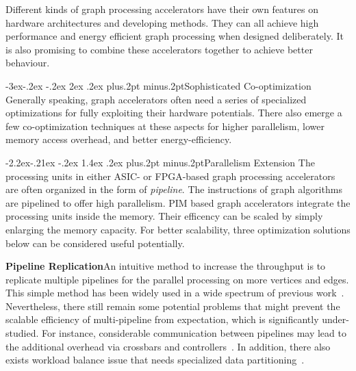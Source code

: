 \documentclass[twoside]{article}
\makeatletter
\def\subsection{\@startsection{subsection}{2}{\z@}%
 {-3ex\@plus -.2ex \@minus -.2ex}%
 {2ex \@plus.2ex}%
{\normalfont\normalsize\protect\baselineskip=12.5pt plus.2pt minus.2pt\bfseries}}
\def\subsubsection{\@startsection{subsubsection}{3}{\z@}%
 {-2.2ex\@plus -.21ex \@minus -.2ex}%
 {1.4ex \@plus.2ex}
{\normalfont\normalsize\protect\baselineskip=12pt plus.2pt minus.2pt\sl}}
\makeatother
\begin{document}
\begin{multicols}{2}
Different kinds of graph processing accelerators have their own features on hardware architectures and developing methods. They can all achieve high performance and energy efficient graph processing when designed deliberately. It is also promising to combine these accelerators together to achieve better behaviour. 

\subsection{Sophisticated Co-optimization}
Generally speaking, graph accelerators often need a series of specialized optimizations for fully exploiting their hardware potentials.
There also emerge a few co-optimization techniques at these aspects for higher parallelism, lower memory access overhead, and better energy-efficiency.

\subsubsection{Parallelism Extension}
The processing units in either ASIC- or FPGA-based graph processing accelerators are often organized in the form of {\em pipeline}. The instructions of graph algorithms are pipelined to offer high parallelism. PIM based graph accelerators integrate the processing units inside the memory. Their efficency can be scaled by simply enlarging the memory capacity. For better scalability, three optimization solutions below can be considered useful potentially.

{\bf Pipeline Replication}\quad An intuitive method to increase the throughput is to replicate multiple pipelines for the parallel processing on more vertices and edges. This simple method has been widely used in a wide spectrum of previous work~\cite{ham2016graphicionado,ozdal2016energy,zhou2017tunao,song2016novelspmv,betkaoui2011graphlet,zhou2016highthroughput,zhou2015fpgasssp}. Nevertheless, there still remain some potential problems that might prevent the scalable efficiency of multi-pipeline from expectation, which is significantly under-studied. For instance, 
considerable communication between pipelines may lead to the additional overhead via crossbars and controllers~\cite{ham2016graphicionado,ozdal2016energy}. In addition, there also exists workload balance issue that needs specialized data partitioning~\cite{Dai2017foregraph,ham2016graphicionado}.


\end{multicols}
\end{document}
